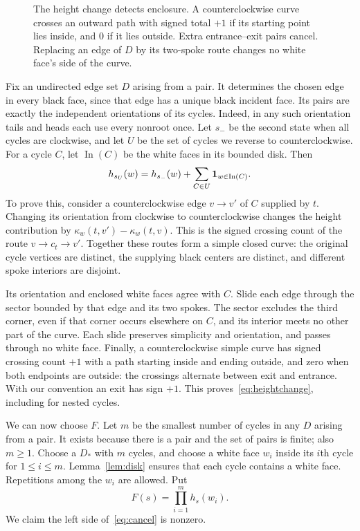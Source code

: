 \documentclass[10pt,a4paper]{amsart}
\theoremstyle{remark}
\newcommand{\In}{\operatorname{In}}
\begin{document}
\begin{figure}[htbp]\centering

\caption{The height change detects enclosure. A counterclockwise curve crosses an outward path with signed total $+1$ if its starting point lies inside, and $0$ if it lies outside. Extra entrance--exit pairs cancel. Replacing an edge of $D$ by its two-spoke route changes no white face's side of the curve.}\label{fig:height}
\end{figure}

Fix an undirected edge set $D$ arising from a pair. It determines the chosen edge in every black face, since that edge has a unique black incident face. Its pairs are exactly the independent orientations of its cycles. Indeed, in any such orientation tails and heads each use every nonroot once. Let $s_-$ be the second state when all cycles are clockwise, and let $U$ be the set of cycles we reverse to counterclockwise. For a cycle $C$, let $\In(C)$ be the white faces in its bounded disk. Then
\begin{equation}\label{eq:heightchange}
 h_{s_U}(w)=h_{s_-}(w)+\sum_{C\in U}{\bf1}_{w\in\In(C)}.
\end{equation}
To prove this, consider a counterclockwise edge $v\to v'$ of $C$ supplied by $t$. Changing its orientation from clockwise to counterclockwise changes the height contribution by $\kappa_w(t,v')-\kappa_w(t,v)$. This is the signed crossing count of the route $v\to c_t\to v'$. Together these routes form a simple closed curve: the original cycle vertices are distinct, the supplying black centers are distinct, and different spoke interiors are disjoint.

Its orientation and enclosed white faces agree with $C$. Slide each edge through the sector bounded by that edge and its two spokes. The sector excludes the third corner, even if that corner occurs elsewhere on $C$, and its interior meets no other part of the curve. Each slide preserves simplicity and orientation, and passes through no white face. Finally, a counterclockwise simple curve has signed crossing count $+1$ with a path starting inside and ending outside, and zero when both endpoints are outside: the crossings alternate between exit and entrance. With our convention an exit has sign $+1$. This proves~\eqref{eq:heightchange}, including for nested cycles.

We can now choose $F$. Let $m$ be the smallest number of cycles in any $D$ arising from a pair. It exists because there is a pair and the set of pairs is finite; also $m\geq1$. Choose a $D_*$ with $m$ cycles, and choose a white face $w_i$ inside its $i$th cycle for $1\leq i\leq m$. Lemma~\ref{lem:disk} ensures that each cycle contains a white face. Repetitions among the $w_i$ are allowed. Put
\begin{equation}\label{eq:test}
 F(s)=\prod_{i=1}^m h_s(w_i).
\end{equation}
We claim the left side of~\eqref{eq:cancel} is nonzero.
\end{document}
